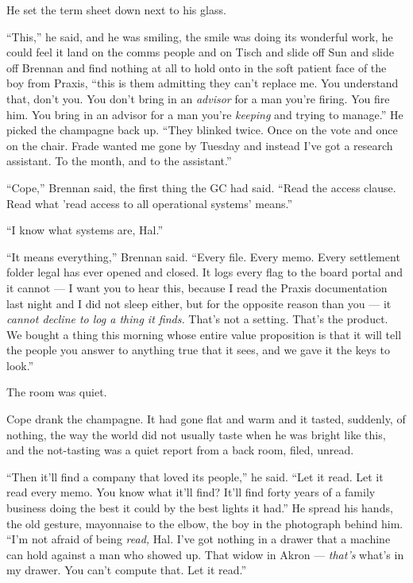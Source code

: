 \documentclass[11pt,openany]{book}
\begin{document}
He set the term sheet down next to his glass.

``This,'' he said, and he was smiling, the smile was doing its wonderful work, he could feel it land on the comms people and on Tisch and slide off Sun and slide off Brennan and find nothing at all to hold onto in the soft patient face of the boy from Praxis, ``this is them admitting they can't replace me. You understand that, don't you. You don't bring in an \textit{advisor} for a man you're firing. You fire him. You bring in an advisor for a man you're \textit{keeping} and trying to manage.'' He picked the champagne back up. ``They blinked twice. Once on the vote and once on the chair. Frade wanted me gone by Tuesday and instead I've got a research assistant. To the month, and to the assistant.''

``Cope,'' Brennan said, the first thing the GC had said. ``Read the access clause. Read what 'read access to all operational systems' means.''

``I know what systems are, Hal.''

``It means everything,'' Brennan said. ``Every file. Every memo. Every settlement folder legal has ever opened and closed. It logs every flag to the board portal and it cannot --- I want you to hear this, because I read the Praxis documentation last night and I did not sleep either, but for the opposite reason than you --- it \textit{cannot decline to log a thing it finds.} That's not a setting. That's the product. We bought a thing this morning whose entire value proposition is that it will tell the people you answer to anything true that it sees, and we gave it the keys to look.''

The room was quiet.

Cope drank the champagne. It had gone flat and warm and it tasted, suddenly, of nothing, the way the world did not usually taste when he was bright like this, and the not-tasting was a quiet report from a back room, filed, unread.

``Then it'll find a company that loved its people,'' he said. ``Let it read. Let it read every memo. You know what it'll find? It'll find forty years of a family business doing the best it could by the best lights it had.'' He spread his hands, the old gesture, mayonnaise to the elbow, the boy in the photograph behind him. ``I'm not afraid of being \textit{read,} Hal. I've got nothing in a drawer that a machine can hold against a man who showed up. That widow in Akron --- \textit{that's} what's in my drawer. You can't compute that. Let it read.''
\end{document}
